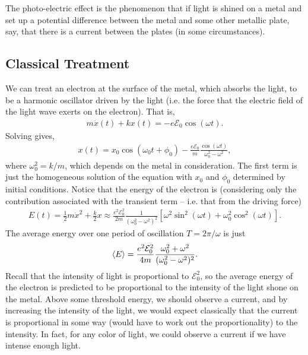 The photo-electric effect is the phenomenon that if light is shined on a metal and set up a potential difference between the metal and some other metallic plate, say, that there is a current between the plates (in some circumstances).

\subsection{Classical Treatment}

We can treat an electron at the surface of the metal, which absorbs the light, to be a harmonic oscillator driven by the light (i.e. the force that the electric field of the light wave exerts on the electron).
That is,
\begin{eqnarray}
    m \ddot{x}(t) + k x(t) = -e \mathcal{E}_{0} \cos(\omega t)
.\end{eqnarray}
Solving gives,
\begin{eqnarray}
    x(t) = x_0 \cos(\omega_0 t + \phi_0) -\frac{e \mathcal{E}_{0}}{m} \frac{\cos(\omega t)}{\omega_0^2 - \omega^2}
,\end{eqnarray}
where $\omega_0^2 = k/m$, which depends on the metal in consideration.
The first term is just the homogeneous solution of the equation with $x_0$ and $\phi_0$ determined by initial conditions.
Notice that the energy of the electron is (considering only the contribution associated with the transient term -- i.e. that from the driving force)
\begin{eqnarray}
    E(t) = \frac{1}{2} m \dot{x}^2 + \frac{k}{2} x \approx \frac{e^2 \mathcal{E}_{0}^2}{2m} \frac{1}{(\omega_0^2 - \omega^2)^2} [ \omega^2 \sin^2(\omega t) + \omega_0^2 \cos^2(\omega t) ]
.\end{eqnarray}
The average energy over one period of oscillation $T = 2 \pi / \omega$  is just
\begin{eqnarray}
    \expval{E} = \frac{e^2 \mathcal{E}_0^2}{4 m} \frac{\omega_0^2 + \omega^2}{(\omega_0^2 - \omega^2)^2}
.\end{eqnarray}
Recall that the intensity of light is proportional to $\mathcal{E}_{0}^2$, so the average energy of the electron is predicted to be proportional to the intensity of the light shone on the metal.
Above some threshold energy, we should observe a current, and by increasing the intensity of the light, we would expect classically that the current is proportional in some way (would have to work out the proportionality) to the intensity.
In fact, for any color of light, we could observe a current if we have intense enough light.


